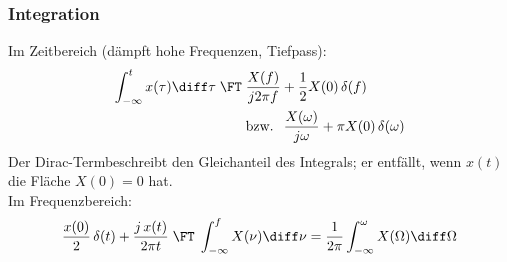 \begin{sectionbox}
    \subsubsection{Integration}
    Im Zeitbereich (dämpft hohe Frequenzen, Tiefpass):
    \begin{align*}
        \int_{-\infty}^{t}x(\tau)\diff\tau\;\FT\; & \frac{X(f)}{j2\pi f}+\frac{1}{2}X(0)\,\delta(f)                  \\
                                                  & \text{bzw. }\;\frac{X(\omega)}{j\omega}+\pi X(0)\,\delta(\omega)
    \end{align*}
    Der Dirac-Termbeschreibt den Gleichanteil des Integrals; er entfällt, wenn $x(t)$ die Fläche $X(0)=0$ hat.\\
    Im Frequenzbereich:
    \begin{equation*}
        \frac{x(0)}{2}\,\delta(t)+\frac{j\,x(t)}{2\pi t}\;\FT\;\int_{-\infty}^{f}X(\nu)\diff\nu=\frac{1}{2\pi}\int_{-\infty}^{\omega}X(\Omega)\diff\Omega
    \end{equation*}
\end{sectionbox}

